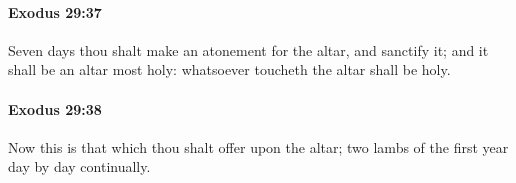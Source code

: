 		\paragraph{Exodus 29:37} %
			\label{EXODUS-29-37}

			Seven days thou shalt make an atonement for the altar, and sanctify it; and it shall be an altar most holy: whatsoever toucheth the altar shall be holy.


		\paragraph{Exodus 29:38} %
			\label{EXODUS-29-38}

			Now this is that which thou shalt offer upon the altar; two lambs of the first year day by day continually.


